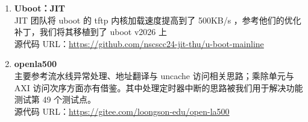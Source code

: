 \begin{enumerate}
  \item \textbf{Uboot：JIT}\\
  JIT 团队将 uboot 的 tftp 内核加载速度提高到了 500KB/s ，参考他们的优化补丁，我们将其移植到了 uboot v2026 上\\
  源代码 URL：\url{https://github.com/nscscc24-jit-thu/u-boot-mainline}
  
  \item \textbf{openla500}\\
  主要参考流水线异常处理、地址翻译与 uncache 访问相关思路；乘除单元与 AXI 访问次序方面亦有借鉴。其中处理定时器中断的思路被我们用于解决功能测试第 49 个测试点。\\
  源代码 URL：\url{https://gitee.com/loongson-edu/open-la500}
  
  

\end{enumerate}

